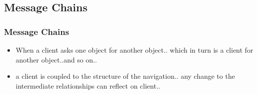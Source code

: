 \documentclass{beamer}
\begin{document}
\subsection{Message Chains}
\begin{frame}
  \frametitle{Message Chains}
  \begin{itemize}
	\item<+-> When a client asks one object for another object.. which in turn is a client for another object..and so on..
	\item<+-> a client is coupled to the structure of the navigation.. any change to the intermediate relationships can reflect on client..
  \end{itemize}
\end{frame}
\end{document}
